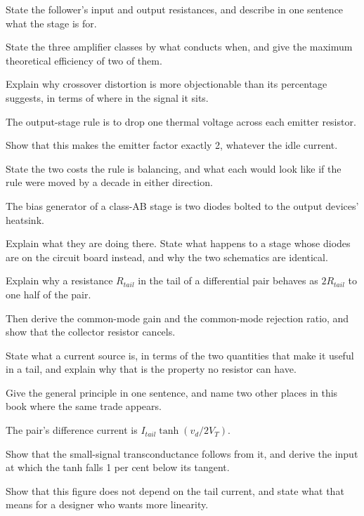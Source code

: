 State the follower's input and output resistances, and describe in one sentence what the stage is for.

 State the three amplifier classes by what conducts when, and give the maximum theoretical efficiency of two of them.

Explain why crossover distortion is more objectionable than its percentage suggests, in terms of where in the signal it sits.

 The output-stage rule is to drop one thermal voltage across each emitter resistor.

Show that this makes the emitter factor exactly 2, whatever the idle current.

State the two costs the rule is balancing, and what each would look like if the rule were moved by a decade in either direction.

 The bias generator of a class-AB stage is two diodes bolted to the output devices' heatsink.

Explain what they are doing there. State what happens to a stage whose diodes are on the circuit board instead, and why the two schematics are identical.

\label{exb:q:9}

 Explain why a resistance $R_{tail}$ in the tail of a differential pair behaves as $2R_{tail}$ to one half of the pair.

Then derive the common-mode gain and the common-mode rejection ratio, and show that the collector resistor cancels.

 State what a current source is, in terms of the two quantities that make it useful in a tail, and explain why that is the property no resistor can have.

Give the general principle in one sentence, and name two other places in this book where the same trade appears.

 The pair's difference current is $I_{tail}\tanh(v_d/2V_T)$.

Show that the small-signal transconductance follows from it, and derive the input at which the tanh falls 1 per cent below its tangent.

Show that this figure does not depend on the tail current, and state what that means for a designer who wants more linearity.

